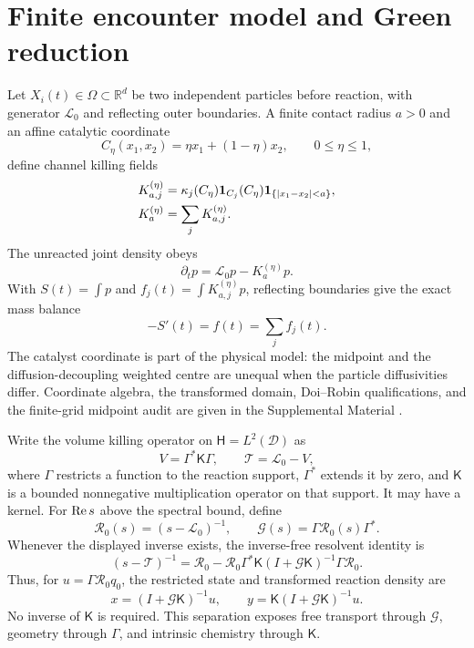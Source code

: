 \documentclass[aps,pre,reprint,amsmath,amssymb,longbibliography,floatfix]{revtex4-2}
\newcommand{\Tgen}{\mathcal T}
\newcommand{\Lfree}{\mathcal L_0}
\newcommand{\Rfree}{\mathcal R_0}
\newcommand{\Gres}{\mathcal G}
\begin{document}
\section{Finite encounter model and Green reduction}
\label{sec:green}

Let \(X_i(t)\in\Omega\subset\mathbb R^d\) be two independent particles before
reaction, with generator \(\Lfree\) and reflecting outer boundaries. A finite
contact radius \(a>0\) and an affine catalytic coordinate
\[
C_\eta(x_1,x_2)=\eta x_1+(1-\eta)x_2,\qquad 0\leq\eta\leq1,
\]
define channel killing fields
\begin{align}
K_{a,j}^{(\eta)}
&=\kappa_j(C_\eta)\mathbf 1_{C_j}(C_\eta)
\mathbf 1_{\{|x_1-x_2|<a\}},\notag\\
K_a^{(\eta)}&=\sum_jK_{a,j}^{(\eta)}.
\label{eq:doi-killing}
\end{align}
The unreacted joint density obeys
\begin{equation}
\partial_t p=\Lfree p-K_a^{(\eta)}p.
\label{eq:joint-fp}
\end{equation}
With \(S(t)=\int p\) and
\(f_j(t)=\int K_{a,j}^{(\eta)}p\), reflecting boundaries give the exact mass
balance
\begin{equation}
-S'(t)=f(t)=\sum_j f_j(t).
\label{eq:mass-balance}
\end{equation}
The catalyst coordinate is part of the physical model: the midpoint and the
diffusion-decoupling weighted centre are unequal when the particle
diffusivities differ. Coordinate algebra, the transformed domain, Doi--Robin
qualifications, and the finite-grid midpoint audit are given in the
Supplemental Material \cite{supplementalMaterial}.

Write the volume killing operator on
\(\mathsf H=L^2(\mathcal D)\) as
\begin{equation}
V=\Gamma^*\mathsf K\Gamma,\qquad
\Tgen=\Lfree-V,
\label{eq:killed-operator}
\end{equation}
where \(\Gamma\) restricts a function to the reaction support,
\(\Gamma^*\) extends it by zero, and \(\mathsf K\) is a bounded nonnegative
multiplication operator on that support. It may have a kernel. For
\({\rm Re}\,s\) above the spectral bound, define
\begin{equation}
\Rfree(s)=(s-\Lfree)^{-1},\qquad
\Gres(s)=\Gamma\Rfree(s)\Gamma^*.
\label{eq:restricted-green}
\end{equation}
Whenever the displayed inverse exists, the inverse-free resolvent identity is
\begin{equation}
(s-\Tgen)^{-1}
=\Rfree-\Rfree\Gamma^*\mathsf K
 (I+\Gres\mathsf K)^{-1}\Gamma\Rfree.
\label{eq:woodbury-operator}
\end{equation}
Thus, for \(u=\Gamma\Rfree q_0\), the restricted state and transformed
reaction density are
\begin{equation}
x=(I+\Gres\mathsf K)^{-1}u,\qquad
y=\mathsf K(I+\Gres\mathsf K)^{-1}u.
\label{eq:support-density}
\end{equation}
No inverse of \(\mathsf K\) is required. This separation exposes free
transport through \(\Gres\), geometry through \(\Gamma\), and intrinsic
chemistry through \(\mathsf K\).
\end{document}
